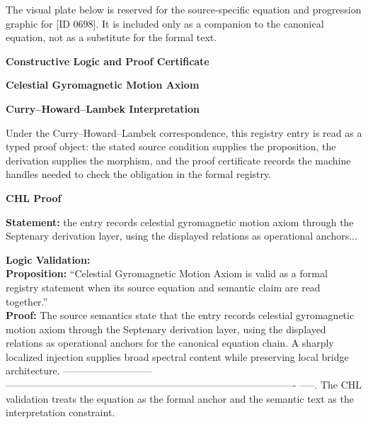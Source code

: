 \begingroup\footnotesize\sloppy
The visual plate below is reserved for the source-specific equation and progression graphic for [ID 0698]. It is included only as a companion to the canonical equation, not as a substitute for the formal text.
\par\endgroup
\ifTZPDarkEdition
{}
\fi

\clearpage
\begingroup\tzpsupportsetup
\noindent\textbf{\fontsize{10.8pt}{12.8pt}\selectfont [ID 0698] Constructive Logic and Proof Certificate}\par
\noindent\textbf{\fontsize{10pt}{12pt}\selectfont Celestial Gyromagnetic Motion Axiom}\par
\vspace{0.45em}
\begingroup
\footnotesize
\setlength{\parskip}{0.22em}
\setlength{\parindent}{0pt}
\noindent\textbf{Curry--Howard--Lambek Interpretation}\par
Under the Curry--Howard--Lambek correspondence, this registry entry is read as a typed proof
object: the stated source condition supplies the proposition, the derivation supplies the
morphism, and the proof certificate records the machine handles needed to check the obligation
in the formal registry.

\vspace{0.45em}
\noindent\textbf{CHL Proof}\par
\textbf{Statement:} the entry records celestial gyromagnetic motion axiom through the Septenary derivation
layer, using the displayed relations as operational anchors...

\textbf{Logic Validation:}\\
\textbf{Proposition:} ``Celestial Gyromagnetic Motion Axiom is valid as a formal registry statement when its
source equation and semantic claim are read together.''\\
\textbf{Proof:} The source semantics state that the entry records celestial gyromagnetic motion axiom
through the Septenary derivation layer, using the displayed relations as operational
anchors for the canonical equation chain. A sharply localized injection supplies broad
spectral content while preserving local bridge architecture. ---------------------------
----------------------------------------------------------------------------------------
-----. The CHL validation treats the equation as the formal anchor and the semantic text
as the interpretation constraint.

